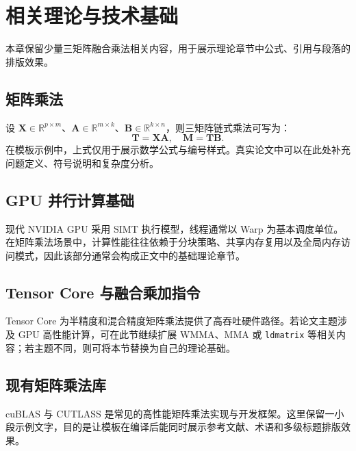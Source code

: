 \section{相关理论与技术基础}

本章保留少量三矩阵融合乘法相关内容，用于展示理论章节中公式、引用与段落的排版效果。

\subsection{矩阵乘法}

设 $\mathbf{X} \in \mathbb{R}^{p \times m}$、$\mathbf{A} \in \mathbb{R}^{m \times k}$、$\mathbf{B} \in \mathbb{R}^{k \times n}$，则三矩阵链式乘法可写为：
\begin{equation}
    \mathbf{T} = \mathbf{X}\mathbf{A}, \quad \mathbf{M} = \mathbf{T}\mathbf{B}.
\end{equation}
在模板示例中，上式仅用于展示数学公式与编号样式。真实论文中可以在此处补充问题定义、符号说明和复杂度分析。

\subsection{GPU 并行计算基础}

现代 NVIDIA GPU 采用 SIMT 执行模型，线程通常以 Warp 为基本调度单位\cite{nvidia2022cuda}。在矩阵乘法场景中，计算性能往往依赖于分块策略、共享内存复用以及全局内存访问模式，因此该部分通常会构成正文中的基础理论章节。

\subsection{Tensor Core 与融合乘加指令}

Tensor Core 为半精度和混合精度矩阵乘法提供了高吞吐硬件路径\cite{demystifying_tc}。若论文主题涉及 GPU 高性能计算，可在此节继续扩展 WMMA、MMA 或 \texttt{ldmatrix} 等相关内容；若主题不同，则可将本节替换为自己的理论基础。

\subsection{现有矩阵乘法库}

cuBLAS 与 CUTLASS 是常见的高性能矩阵乘法实现与开发框架\cite{nvidia2022cutlass}。这里保留一小段示例文字，目的是让模板在编译后能同时展示参考文献、术语和多级标题排版效果。

